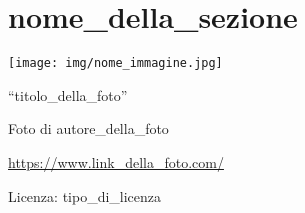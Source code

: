 \part{nome_della_sezione}

\texttt{[image: img/nome\_immagine.jpg]}
  \begin{center}
    {\large ``titolo_della_foto''}\par
    Foto di autore_della_foto\par
    \url{https://www.link_della_foto.com/}\par
    Licenza: tipo_di_licenza\par
  \end{center}
\clearpage
\cleardoublepage
